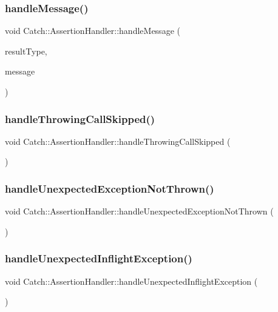 \subsubsection{handleMessage()}
{\footnotesize\ttfamily void Catch\+::\+Assertion\+Handler\+::handle\+Message (\begin{DoxyParamCaption}\item[{\textbf{ Result\+Was\+::\+Of\+Type}}]{result\+Type,  }\item[{\textbf{ String\+Ref} const \&}]{message }\end{DoxyParamCaption})}

\mbox{\label{class_catch_1_1_assertion_handler_a67a194d5518f307c4a16faa03a7f7442}} 
\subsubsection{handleThrowingCallSkipped()}
{\footnotesize\ttfamily void Catch\+::\+Assertion\+Handler\+::handle\+Throwing\+Call\+Skipped (\begin{DoxyParamCaption}{ }\end{DoxyParamCaption})}

\mbox{\label{class_catch_1_1_assertion_handler_a7764d0adb6ed5eeb10964f6abc02fab1}} 
\subsubsection{handleUnexpectedExceptionNotThrown()}
{\footnotesize\ttfamily void Catch\+::\+Assertion\+Handler\+::handle\+Unexpected\+Exception\+Not\+Thrown (\begin{DoxyParamCaption}{ }\end{DoxyParamCaption})}

\mbox{\label{class_catch_1_1_assertion_handler_aa2504dad6a91f3645e5f52c932c11270}} 
\subsubsection{handleUnexpectedInflightException()}
{\footnotesize\ttfamily void Catch\+::\+Assertion\+Handler\+::handle\+Unexpected\+Inflight\+Exception (\begin{DoxyParamCaption}{ }\end{DoxyParamCaption})}

